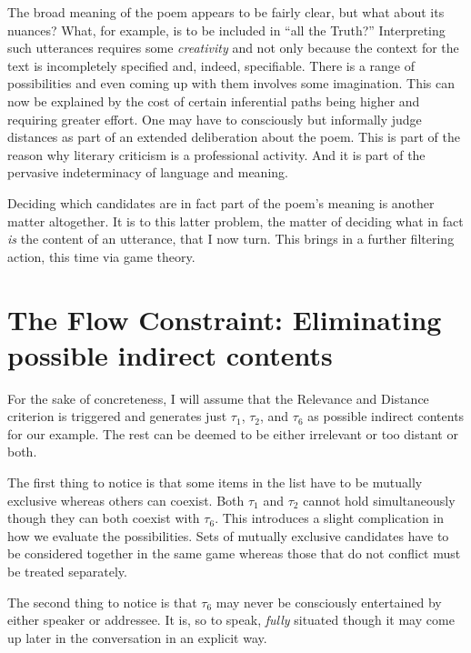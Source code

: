 \noindent The broad meaning of the poem appears to be fairly clear, but what about its nuances? What, for example, is to be included in ``all the Truth?'' Interpreting such utterances requires some \emph{creativity} and not only because the context for the text is incompletely specified and, indeed, specifiable. There is a range of possibilities and even coming up with them involves some imagination. This can now be explained by the cost of certain inferential paths being higher and requiring greater effort. One may have to consciously but informally judge distances as part of an extended deliberation about the poem. This is part of the reason why literary criticism is a professional activity. And it is part of the pervasive indeterminacy of language and meaning. 

Deciding which candidates are in fact part of the poem's meaning is another matter altogether. It is to this latter problem, the matter of deciding what in fact \emph{is} the content of an utterance, that I now turn. This brings in a further filtering action, this time via game theory.


\section{The Flow Constraint: Eliminating possible indirect contents} \label{sec:eliminating possible indirect contents}

For the sake of concreteness, I will assume that the Relevance and Distance criterion is triggered and generates just $\tau_{1}$, $\tau_{2}$, and $\tau_6$ as possible indirect contents for our example. The rest can be deemed to be either irrelevant or too distant or both.

The first thing to notice is that some items in the list have to be mutually exclusive whereas others can coexist. Both $\tau_{1}$ and $\tau_{2}$ cannot hold simultaneously though they can both coexist with $\tau_6$. This introduces a slight complication in how we evaluate the possibilities. Sets of mutually exclusive candidates have to be considered together in the same game whereas those that do not conflict must be treated separately.

The second thing to notice is that $\tau_6$ may never be consciously entertained by either speaker or addressee. It is, so to speak, \emph{fully} situated though it may come up later in the conversation in an explicit way. 


